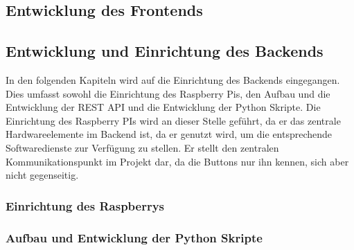 \newpage

\subsection{Entwicklung des Frontends}  
\label{sec:Entwicklung der Frontends-1} 



\newpage

\subsection{Entwicklung und Einrichtung des Backends}  
\label{sec:Entwicklung und Einrichtung des Backends-1} 

In den folgenden Kapiteln wird auf die Einrichtung des Backends eingegangen. Dies umfasst sowohl die Einrichtung des Raspberry Pis, den Aufbau und die Entwicklung der \ac{REST} \ac{API} und die Entwicklung der Python Skripte. Die Einrichtung des Raspberry PIs wird an dieser Stelle geführt, da er das zentrale Hardwareelemente im Backend ist, da er genutzt wird, um die entsprechende Softwaredienste zur Verfügung zu stellen. Er stellt den zentralen Kommunikationspunkt im Projekt dar, da die Buttons nur ihn kennen, sich aber nicht gegenseitig. 

\subsubsection{Einrichtung des Raspberrys}  
\label{sec:Einrichtung des Raspberrys-1}





\subsubsection{Aufbau und Entwicklung der Python Skripte}  
\label{sec:Aufbau und Entwicklung der Python Skripte-1}



\newpage